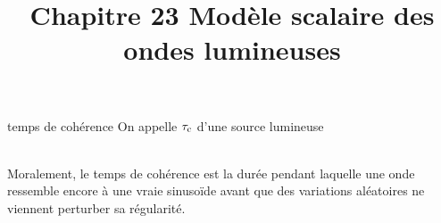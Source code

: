 

\setcounter{chapitre}{23}

\title{\Large Chapitre 23 \newline \Huge Modèle scalaire des ondes lumineuses}



\maketitle

\newcommand{\tc}{\tau_\mr{c}}


\begin{definition}{}{temps de cohérence}
    On appelle  $\tc$ d'une source lumineuse 

    \\Moralement, le temps de cohérence est la durée pendant laquelle une onde ressemble encore à une vraie sinusoïde avant que des variations aléatoires ne viennent perturber sa régularité.
\end{definition}

